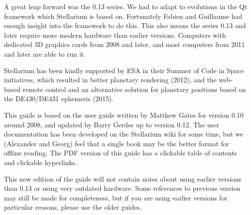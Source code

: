 

A great leap forward was the 0.13 series. We had to adapt to
evolutions in the Qt framework which Stellarium is based
on. Fortunately Fabien and Guillaume had enough insight into the
framework to do this. This also means the series 0.13 and later
require more modern hardware than earlier versions. Computers 
with dedicated 3D graphics cards from 2008 and later, and 
most computers from 2011 and later are able to run it. 

Stellarium has been kindly supported by ESA in their Summer of Code in
Space initiatives, which resulted in better planetary rendering
(2012), and the web-based remote control and an alternative solution
for planetary positions based on the DE430/DE431 ephemeris (2015).


This guide is based on the user guide written by Matthew Gates for
version 0.10 around 2008, and updated by Barry Gerdes up to version
0.12. %
The user documentation has been developed on the Stellarium wiki for
some time, but we (Alexander and Georg) feel that a single book may
be the better format for offline reading. The PDF version of this 
guide has a clickable table of contents and clickable hyperlinks.

This new edition of the guide will not contain notes about using
earlier versions than 0.13 or using very outdated hardware. Some
references to previous version may still be made for completeness, 
but if you are using earlier versions
for particular reasons, please use the older guides.

